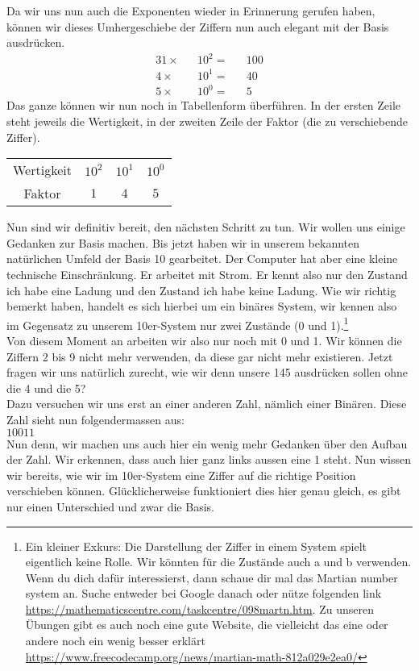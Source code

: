 Da wir uns nun auch die Exponenten wieder in Erinnerung gerufen haben, können wir dieses Umhergeschiebe der Ziffern
nun auch elegant mit der Basis ausdrücken.
\begin{alignat*}{3}
    1 \times && 10^2 = && 100\\
    4 \times && 10^1 = && 40\\
    5 \times && 10^0 = && 5
\end{alignat*}
Das ganze können wir nun noch in Tabellenform überführen. In der ersten Zeile steht jeweils die Wertigkeit, in der
zweiten Zeile der Faktor (die zu verschiebende Ziffer).\\
\begin{center}
    \begin{tabular}{ c c c c }
        Wertigkeit & $10^2$ & $10^1$ & $10^0$ \\
        Faktor     & $1$    & $4$    & $5$
    \end{tabular}
\end{center}

Nun sind wir definitiv bereit, den nächsten Schritt zu tun. Wir wollen uns einige Gedanken zur Basis machen. Bis jetzt
haben wir in unserem bekannten natürlichen Umfeld der Basis 10 gearbeitet. Der Computer hat aber eine kleine technische
Einschränkung. Er arbeitet mit Strom. Er kennt also nur den Zustand \frqq ich habe eine Ladung\flqq{} und den Zustand \frqq ich habe
keine Ladung\flqq. Wie wir richtig bemerkt haben, handelt es sich hierbei um ein binäres System, wir kennen also im Gegensatz
zu unserem 10er-System nur zwei Zustände (0 und 1).\footnote{Ein kleiner Exkurs: Die Darstellung der Ziffer in einem System spielt eigentlich keine Rolle.
Wir könnten für die Zustände auch a und b verwenden. Wenn du dich dafür interessierst, dann schaue dir mal das \frqq Martian number system\flqq{} an.
Suche entweder bei Google danach oder nütze folgenden link \url{https://mathematicscentre.com/taskcentre/098martn.htm}. Zu unseren Übungen gibt es
auch noch eine gute Website, die vielleicht das eine oder andere noch ein wenig besser erklärt \url{https://www.freecodecamp.org/news/martian-math-812a029e2ea0/}}\\
Von diesem Moment an arbeiten wir also nur noch mit 0 und 1. Wir können die Ziffern 2 bis 9 nicht mehr verwenden, da diese
gar nicht mehr existieren. Jetzt fragen wir uns natürlich zurecht, wie wir denn unsere 145 ausdrücken sollen ohne die 4 und die 5?\\
Dazu versuchen wir uns erst an einer anderen Zahl, nämlich einer Binären. Diese Zahl sieht nun folgendermassen aus:\\
$10011$\\
Nun denn, wir machen uns auch hier ein wenig mehr Gedanken über den Aufbau der Zahl. Wir erkennen, dass auch hier ganz
links aussen eine 1 steht. Nun wissen wir bereits, wie wir im 10er-System eine Ziffer auf die richtige Position verschieben
können. Glücklicherweise funktioniert dies hier genau gleich, es gibt nur einen Unterschied und zwar die Basis.


